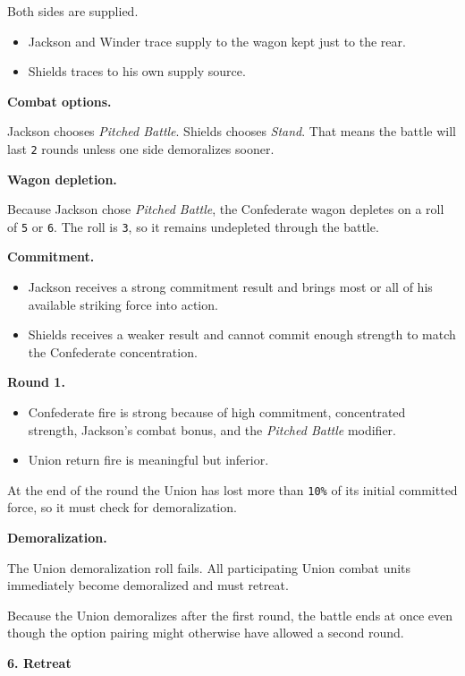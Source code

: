 \documentclass[11pt]{article}
\begin{document}
Both sides are supplied.

\begin{itemize}
\item Jackson and Winder trace supply to the wagon kept just to the rear.
\item Shields traces to his own supply source.
\end{itemize}

\textbf{Combat options.}

Jackson chooses \textit{Pitched Battle}. Shields chooses \textit{Stand}. That means the battle will last \texttt{2} rounds unless one side demoralizes sooner.

\textbf{Wagon depletion.}

Because Jackson chose \textit{Pitched Battle}, the Confederate wagon depletes on a roll of \texttt{5} or \texttt{6}. The roll is \texttt{3}, so it remains undepleted through the battle.

\textbf{Commitment.}

\begin{itemize}
\item Jackson receives a strong commitment result and brings most or all of his available striking force into action.
\item Shields receives a weaker result and cannot commit enough strength to match the Confederate concentration.
\end{itemize}

\textbf{Round 1.}

\begin{itemize}
\item Confederate fire is strong because of high commitment, concentrated strength, Jackson's combat bonus, and the \textit{Pitched Battle} modifier.
\item Union return fire is meaningful but inferior.
\end{itemize}

At the end of the round the Union has lost more than \texttt{10\%} of its initial committed force, so it must check for demoralization.

\textbf{Demoralization.}

The Union demoralization roll fails. All participating Union combat units immediately become demoralized and must retreat.

Because the Union demoralizes after the first round, the battle ends at once even though the option pairing might otherwise have allowed a second round.

\textbf{6. Retreat}
\end{document}
